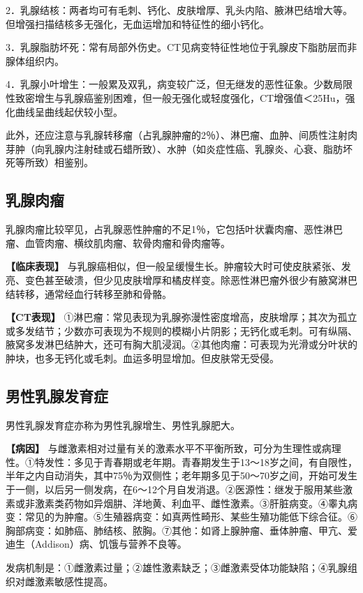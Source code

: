 2．乳腺结核：两者均可有毛刺、钙化、皮肤增厚、乳头内陷、腋淋巴结增大等。但增强扫描结核多无强化，无血运增加和特征性的细小钙化。

3．乳腺脂肪坏死：常有局部外伤史。CT见病变特征性地位于乳腺皮下脂肪层而非腺体组织内。

4．乳腺小叶增生：一般累及双乳，病变较广泛，但无继发的恶性征象。少数局限性致密增生与乳腺癌鉴别困难，但一般无强化或轻度强化，CT增强值＜25Hu，强化曲线呈曲线起伏较小型。

此外，还应注意与乳腺转移瘤（占乳腺肿瘤的2％）、淋巴瘤、血肿、间质性注射肉芽肿（向乳腺内注射硅或石蜡所致）、水肿（如炎症性癌、乳腺炎、心衰、脂肪坏死等所致）相鉴别。

\subsection{乳腺肉瘤}

乳腺肉瘤比较罕见，占乳腺恶性肿瘤的不足1％，它包括叶状囊肉瘤、恶性淋巴瘤、血管肉瘤、横纹肌肉瘤、软骨肉瘤和骨肉瘤等。

\textbf{【临床表现】}
与乳腺癌相似，但一般呈缓慢生长。肿瘤较大时可使皮肤紧张、发亮、变色甚至破溃，但少见皮肤增厚和橘皮样变。除恶性淋巴瘤外很少有腋窝淋巴结转移，通常经血行转移至肺和骨骼。

\textbf{【CT表现】}
①淋巴瘤：常见表现为乳腺弥漫性密度增高，皮肤增厚；其次为孤立或多发结节；少数亦可表现为不规则的模糊小片阴影；无钙化或毛刺。可有纵隔、腋窝多发淋巴结肿大，还可有胸大肌浸润。②其他肉瘤：可表现为光滑或分叶状的肿块，也多无钙化或毛刺。血运多明显增加。但皮肤常无受侵。

\subsection{男性乳腺发育症}

男性乳腺发育症亦称为男性乳腺增生、男性乳腺肥大。

\textbf{【病因】}
与雌激素相对过量有关的激素水平不平衡所致，可分为生理性或病理性。①特发性：多见于青春期或老年期。青春期发生于13～18岁之间，有自限性，半年之内自动消失，其中75％为双侧性；老年期多见于50～70岁之间，开始可发生于一侧，以后另一侧发病，在6～12个月自发消退。②医源性：继发于服用某些激素或非激素类药物如异烟肼、洋地黄、利血平、雌性激素。③肝脏病变。④睾丸病变：常见的为肿瘤。⑤生殖器病变：如真两性畸形、某些生殖功能低下综合征。⑥胸部病变：如肺癌、肺结核、脓胸。⑦其他：如肾上腺肿瘤、垂体肿瘤、甲亢、爱迪生（Addison）病、饥饿与营养不良等。

发病机制是：①雌激素过量；②雄性激素缺乏；③雌激素受体功能缺陷；④乳腺组织对雌激素敏感性提高。

